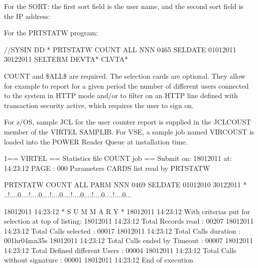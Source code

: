 \documentclass[letterpaper,10pt,english]{sphinxmanual}
\begin{document}
For the SORT: the first sort field is the user name, and the second sort field is the IP address:

\begin{sphinxVerbatim}[commandchars=\\\{\}]
  
 
\end{sphinxVerbatim}

For the PRTSTATW program:

\begin{sphinxVerbatim}[commandchars=\\\{\}]
//SYSIN DD *
PRTSTATW COUNT \PYGZdl{}ALL\PYGZdl{} NNN 0465
SELDATE 01012011 30122011
SELTERM DEVTA* CLVTA*
\end{sphinxVerbatim}

COUNT and \$ALL\$ are required. The selection cards are optional. They allow for example to report for a given period the number of different users connected to the system in HTTP mode and/or to filter on an HTTP line defined with transaction security active, which requires the user to sign on.

For z/OS, sample JCL for the user counter report is supplied in the JCLCOUST member of the VIRTEL SAMPLIB. For VSE, a sample job named VIRCOUST is loaded into the POWER Reader Queue at installation time.

\begin{sphinxVerbatim}[commandchars=\\\{\}]
1== VIRTEL == Statistics file COUNT job ==
Submit on: 18\PYGZhy{}01\PYGZhy{}2011 at: 14:23:12              PAGE : 000
Parameters CARDS list read by PRTSTATW

PRTSTATW COUNT                  \PYGZdl{}ALL\PYGZdl{}   PARM        NNN 0469
SELDATE 01012010 30122011
* ..!....0....!....0....!....0....!....0....!....0....!....0...

18\PYGZhy{}01\PYGZhy{}2011      14:23:12                * S U M M A R Y *
18\PYGZhy{}01\PYGZhy{}2011      14:23:12                With criterias put for selection at top of listing:
18\PYGZhy{}01\PYGZhy{}2011      14:23:12                Total Records read              : 00207
18\PYGZhy{}01\PYGZhy{}2011      14:23:12                Total Calls selected            : 00017
18\PYGZhy{}01\PYGZhy{}2011      14:23:12                Total Calls duration            : 001hr04mn35s
18\PYGZhy{}01\PYGZhy{}2011      14:23:12                Total Calls ended by \PYGZdq{}Timeout\PYGZdq{}  : 00007
18\PYGZhy{}01\PYGZhy{}2011      14:23:12                Total Defined different Users   : 00004
18\PYGZhy{}01\PYGZhy{}2011      14:23:12                Total Calls without signature   : 00001
18\PYGZhy{}01\PYGZhy{}2011      14:23:12                End of execution
\end{sphinxVerbatim}
\end{document}
